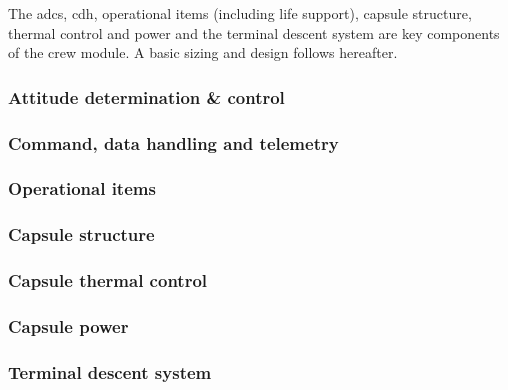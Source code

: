 The \gls{adcs}, \gls{cdh}, operational items (including life support), capsule structure, thermal control and power and the terminal descent system are key components of the crew module. A basic sizing and design follows hereafter.

\subsubsection{Attitude determination \& control} \label{subsec:adcs}


\subsubsection{Command, data handling and telemetry} \label{subsec:cdh}


\subsubsection{Operational items} \label{subsec:crewop}


\subsubsection{Capsule structure} \label{subsec:crewstruc}


\subsubsection{Capsule thermal control} \label{subsec:crewthermalcontrol}


\subsubsection{Capsule power} \label{subsec:pwer}


\subsubsection{Terminal descent system} \label{subsec:crewtermdescent}





